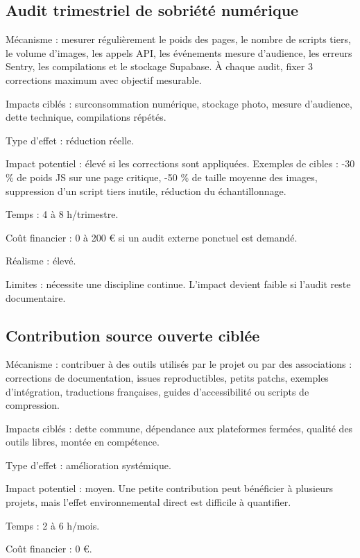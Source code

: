 \documentclass[
  10pt,
  a4paper,
  DIV=11,
  numbers=noendperiod,
  oneside]{scrreprt}
\begin{document}
\subsection{Audit trimestriel de sobriété
numérique}\label{audit-trimestriel-de-sobriuxe9tuxe9-numuxe9rique}

Mécanisme : mesurer régulièrement le poids des pages, le nombre de
scripts tiers, le volume d'images, les appels API, les événements mesure
d'audience, les erreurs Sentry, les compilations et le stockage
Supabase. À chaque audit, fixer 3 corrections maximum avec objectif
mesurable.

Impacts ciblés : surconsommation numérique, stockage photo, mesure
d'audience, dette technique, compilations répétés.

Type d'effet : réduction réelle.

Impact potentiel : élevé si les corrections sont appliquées. Exemples de
cibles : -30 \% de poids JS sur une page critique, -50 \% de taille
moyenne des images, suppression d'un script tiers inutile, réduction du
échantillonnage.

Temps : 4 à 8 h/trimestre.

Coût financier : 0 à 200 € si un audit externe ponctuel est demandé.

Réalisme : élevé.

Limites : nécessite une discipline continue. L'impact devient faible si
l'audit reste documentaire.

\subsection{Contribution source ouverte
ciblée}\label{contribution-source-ouverte-cibluxe9e}

Mécanisme : contribuer à des outils utilisés par le projet ou par des
associations : corrections de documentation, issues reproductibles,
petits patchs, exemples d'intégration, traductions françaises, guides
d'accessibilité ou scripts de compression.

Impacts ciblés : dette commune, dépendance aux plateformes fermées,
qualité des outils libres, montée en compétence.

Type d'effet : amélioration systémique.

Impact potentiel : moyen. Une petite contribution peut bénéficier à
plusieurs projets, mais l'effet environnemental direct est difficile à
quantifier.

Temps : 2 à 6 h/mois.

Coût financier : 0 €.
\end{document}
